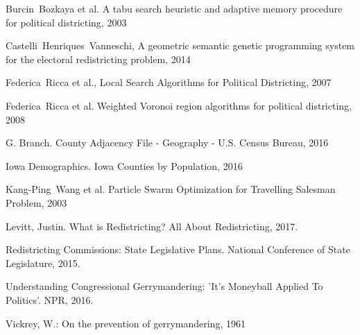 \documentclass[journal]{IEEEtran}
\begin{document}
\begin{thebibliography}{1}

    Burcin~Bozkaya et al.  A tabu search heuristic and adaptive memory procedure
        for political districting, 2003

    Castelli~Henriques~Vanneschi, A geometric semantic genetic programming system for the electoral redistricting problem, 2014

    Federica~Ricca et al., Local Search Algorithms for Political Districting, 2007

    Federica~Ricca et al. Weighted Voronoi region algorithms for political
        districting, 2008

    G. Branch. County Adjacency File - Geography - U.S. Census Bureau, 2016

    Iowa Demographics. Iowa Counties by Population, 2016

    Kang-Ping~Wang et al. Particle Swarm Optimization for Travelling Salesman
        Problem, 2003

    Levitt, Justin. What is Redistricting? All About Redistricting, 2017.

    Redistricting Commissions: State Legislative Plans. National Conference of State Legislature, 2015.

    Understanding Congressional Gerrymandering: 'It's Moneyball Applied To Politics'. NPR, 2016.

    Vickrey, W.: On the prevention of gerrymandering, 1961

\end{thebibliography}
\end{document}
